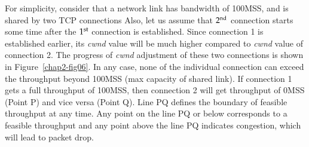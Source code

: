 \begin{multicols}{2}
For simplicity, consider that a network link has bandwidth of 100MSS, and is shared by two TCP connections Also, let us assume that ${\rm 2}^{\text{nd}}$ connection starts some time after the ${\rm 1}^{\text{st}}$  connection is established. Since connection 1 is established earlier, its \textit{cwnd} value will be much higher compared to \textit{cwnd} value of connection 2. The progress of \textit{cwnd} adjustment of these two connections is shown in Figure~\ref{chap2-fig06}. In any case, none of the individual connection can exceed the throughput  beyond 100MSS (max capacity of shared link). If connection 1 gets a full throughput of 100MSS, then connection 2 will get throughput of 0MSS (Point P) and vice versa (Point Q).  Line PQ defines the boundary of feasible throughput at any time. Any point on the line PQ or below corresponds to a feasible throughput and any point above the line PQ indicates congestion, which will lead to packet drop.


\end{multicols}
